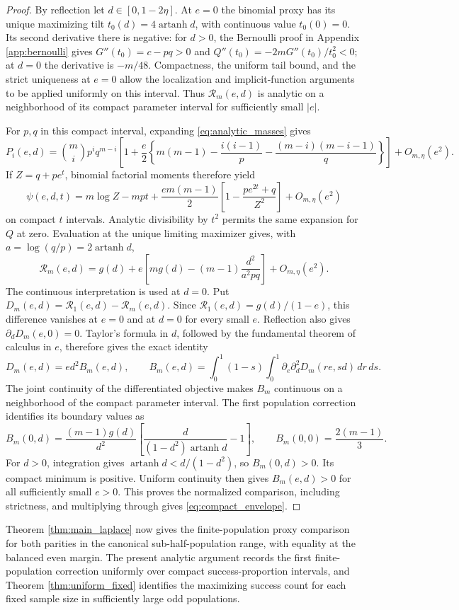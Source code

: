 \begin{proof}
By reflection let $d\in[0,1-2\eta]$. At $e=0$ the binomial proxy has its unique maximizing tilt $t_0(d)=4\operatorname{artanh}d$, with continuous value $t_0(0)=0$. Its second derivative there is negative: for $d>0$, the Bernoulli proof in Appendix \ref{app:bernoulli} gives $G''(t_0)=c-pq>0$ and $Q''(t_0)=-2mG''(t_0)/t_0^2<0$; at $d=0$ the derivative is $-m/48$. Compactness, the uniform tail bound, and the strict uniqueness at $e=0$ allow the localization and implicit-function arguments to be applied uniformly on this interval. Thus $\mathcal R_m(e,d)$ is analytic on a neighborhood of its compact parameter interval for sufficiently small $|e|$.

For $p,q$ in this compact interval, expanding \eqref{eq:analytic_masses} gives
\[
 P_i(e,d)=\binom mi p^iq^{m-i}\left[
 1+\frac e2\left\{m(m-1)-\frac{i(i-1)}p
 -\frac{(m-i)(m-i-1)}q\right\}\right]+O_{m,\eta}(e^2).
\]
If $Z=q+pe^t$, binomial factorial moments therefore yield
\begin{equation}\label{eq:first_order_psi}
 \psi(e,d,t)=m\log Z-mpt+
 \frac{em(m-1)}2\left[1-\frac{pe^{2t}+q}{Z^2}\right]+O_{m,\eta}(e^2)
\end{equation}
on compact $t$ intervals. Analytic divisibility by $t^2$ permits the same expansion for $Q$ at zero. Evaluation at the unique limiting maximizer gives, with $a=\log(q/p)=2\operatorname{artanh}d$,
\[
 \mathcal R_m(e,d)=g(d)+e\left[m g(d)-(m-1)\frac{d^2}{a^2pq}\right]+O_{m,\eta}(e^2).
\]
The continuous interpretation is used at $d=0$. Put $D_m(e,d)=\mathcal R_1(e,d)-\mathcal R_m(e,d)$. Since $\mathcal R_1(e,d)=g(d)/(1-e)$, this difference vanishes at $e=0$ and at $d=0$ for every small $e$. Reflection also gives $\partial_d D_m(e,0)=0$. Taylor's formula in $d$, followed by the fundamental theorem of calculus in $e$, therefore gives the exact identity
\[
 D_m(e,d)=e d^2 B_m(e,d),\qquad
 B_m(e,d)=\int_0^1(1-s)\int_0^1
 \partial_e\partial_d^2D_m(re,sd)\,dr\,ds.
\]
The joint continuity of the differentiated objective makes $B_m$ continuous on a neighborhood of the compact parameter interval. The first population correction identifies its boundary values as
\[
 B_m(0,d)=\frac{(m-1)g(d)}{d^2}
 \left[\frac{d}{(1-d^2)\operatorname{artanh}d}-1\right],
 \qquad B_m(0,0)=\frac{2(m-1)}3.
\]
For $d>0$, integration gives $\operatorname{artanh}d<d/(1-d^2)$, so $B_m(0,d)>0$. Its compact minimum is positive. Uniform continuity then gives $B_m(e,d)>0$ for all sufficiently small $e>0$. This proves the normalized comparison, including strictness, and multiplying through gives \eqref{eq:compact_envelope}.
\end{proof}

\begin{remark}
Theorem \ref{thm:main_laplace} now gives the finite-population proxy comparison for both parities in the canonical sub-half-population range, with equality at the balanced even margin. The present analytic argument records the first finite-population correction uniformly over compact success-proportion intervals, and Theorem \ref{thm:uniform_fixed} identifies the maximizing success count for each fixed sample size in sufficiently large odd populations.
\end{remark}
